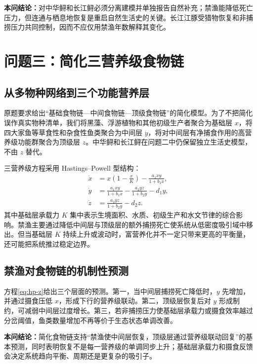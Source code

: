 \documentclass[withoutpreface,bwprint]{cumcmthesis}
\newcommand{\questionconclusion}[1]{%
  \par\medskip\noindent\textbf{本问结论：}#1\par\medskip}
\begin{document}
\questionconclusion{对中华鲟和长江鲟必须分离建模并单独报告自然补充；禁渔能降低死亡压力，但连通与栖息地恢复是重启自然生活史的关键。长江江豚受猎物恢复和非捕捞压力共同控制，因而不应仅用禁渔年数解释其变化。}

\section{问题三：简化三营养级食物链}
\renewcommand{\theequation}{5.\arabic{equation}}\setcounter{equation}{0}

\subsection{从多物种网络到三个功能营养层}

原题要求给出“基础食物链—中间食物链—顶级食物链”的简化模型。为了不把简化误作真实物种清单，我们将黑藻、浮游植物和其他初级生产者聚合为基础层 $x$，将四大家鱼等草食性和杂食性鱼类聚合为中间层 $y$，将对中间层有净捕食作用的高营养级功能群聚合为顶级层 $z$。中华鲟和长江鲟在问题二中仍保留独立生活史模型，不由 $z$ 替代。

三营养级方程采用 Hastings--Powell 型结构\cite{hastings1991}：
\begin{align}
\dot x&=x\left(1-\frac{x}{K}\right)-\frac{a_1xy}{1+b_1x},\label{eq:hp-x}\\
\dot y&=\frac{a_1xy}{1+b_1x}-\frac{a_2yz}{1+b_2y}-d_1y,\label{eq:hp-y}\\
\dot z&=\frac{a_2yz}{1+b_2y}-d_2z.\label{eq:hp-z}
\end{align}
其中基础层承载力 $K$ 集中表示生境面积、水质、初级生产和水文节律的综合影响。禁渔主要通过降低中间层与顶级层的额外捕捞死亡使系统从低密度吸引域中移出。但当基础层 $K$ 持续上升或波动时，富营养化并不一定只带来更高的平衡量，还可能把系统推过稳定边界\cite{may1977}。\AIassistmark

\subsection{禁渔对食物链的机制性预测}

方程\eqref{eq:hp-z}给出三个层面的预测。第一，当中间层捕捞死亡降低时，$y$ 先增加，并通过摄食压低 $x$，形成下行的营养级联动。第二，顶级层恢复后对 $y$ 形成制约，可减弱中间层过度增长。第三，若非捕捞压力使基础层承载力或摄食效率越过分岔阈值，鱼类数量增加不再等价于生态状态单调改善。

\questionconclusion{简化食物链支持“禁渔使中间层恢复，顶级层通过营养级联动回复”的基本预测，同时表明恢复不是每一营养级的单调同步上升；基础层承载力和摄食反馈会决定系统趋向平衡、周期还是更复杂的吸引子。}
\end{document}
